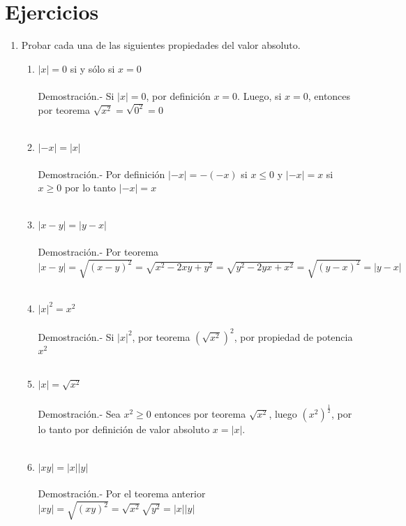 \section{Ejercicios}
\begin{enumerate}
\item Probar cada una de las siguientes propiedades del valor absoluto.\\
\begin{enumerate}[\bfseries (a)]
\item $|x|=0$ si y sólo si $x=0$\\\\
Demostración.- \; Si $|x|=0$, por definición $x=0$. Luego, si $x=0$, entonces por teorema $\sqrt{x^2}=\sqrt{0^2}=0$\\\\

\item $|-x|=|x|$\\\\
Demostración.- \; Por definición $|-x|=-(-x)$ si $x\leq 0$ y $|-x|=x$ si $x\geq 0$ por lo tanto $|-x|=x$\\\\ 

\item $|x-y|=|y-x|$\\\\
Demostración.- \; Por teorema $|x-y|=\sqrt{(x-y)^2}=\sqrt{x^2-2xy+y^2}=\sqrt{y^2-2yx+x^2}=\sqrt{(y-x)^2}=|y-x|$\\\\ 

\item $|x|^2=x^2$\\\\
Demostración.- \; Si $|x|^2$, por teorema $\left( \sqrt{x^2} \right)^2$, por propiedad de potencia $x^2$\\\\

\item $|x|=\sqrt{x^2}$\\\\
Demostración.- \; Sea $x^2\geq 0$ entonces por teorema $\sqrt{x^2}$, luego $(x^2)^{\frac{1}{2}}$, por lo tanto por definición de valor absoluto $x=|x|$.\\\\ 

\item $|xy|=|x||y|$\\\\
Demostración.- \; Por el teorema anterior $|xy|=\sqrt{(xy)^2}=\sqrt{x^2} \sqrt{y^2} = |x||y|$\\\\ 


\end{enumerate}
\end{enumerate}
